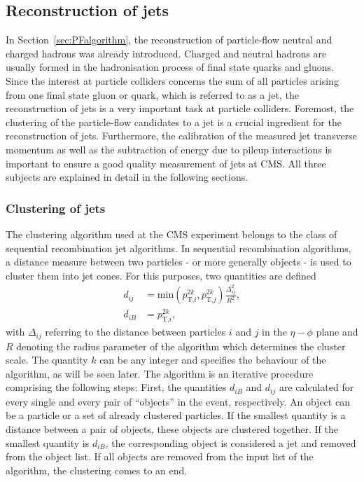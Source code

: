 \subsection{Reconstruction of jets} 
\label{sec:JetReconstruction}
In Section~\ref{sec:PFalgorithm}, the reconstruction of particle-flow neutral and charged hadrons was already introduced.
Charged and neutral hadrons are usually formed in the hadronisation process of final state quarks and gluons.
Since the interest at particle colliders concerns the sum of all particles arising from one final state gluon or quark, which is referred to as a jet, the reconstruction of jets is a very important task at particle colliders.
Foremost, the clustering of the particle-flow candidates to a jet is a crucial ingredient for the reconstruction of jets.
Furthermore, the calibration of the measured jet transverse momentum as well as the subtraction of energy due to pileup interactions is important to ensure a good quality \pt measurement of jets at CMS.
All three subjects are explained in detail in the following sections.
\subsubsection*{Clustering of jets}
The clustering algorithm used at the CMS experiment belongs to the class of sequential recombination jet algorithms.
In sequential recombination algorithms, a distance measure between two particles - or more generally objects - is used to cluster them into jet cones.
For this purposes, two quantities are defined
\begin{equation}
\begin{aligned}
\label{eq:Antikt}
d_{ij} &= \text{min}\left( p_{\text{T,}i}^{2k},p_{\text{T,}j}^{2k} \right) \frac{\Delta_{ij}^2}{R^2},\\
d_{iB} &= p_{\text{T,}i}^{2k},
\end{aligned} 
\end{equation}
with $\Delta_{ij}$ referring to the distance between particles $i$ and $j$ in the $\eta - \phi$ plane and $R$ denoting the radius parameter of the algorithm which determines the cluster scale.
The quantity $k$ can be any integer and specifies the behaviour of the algorithm, as will be seen later.
The algorithm is an iterative procedure comprising the following steps: 
First, the quantities $d_{iB}$ and $d_{ij}$ are calculated for every single and every pair of ``objects'' in the event, respectively.
An object can be a particle or a set of already clustered particles.
If the smallest quantity is a distance between a pair of objects, these objects are clustered together.
If the smallest quantity is $d_{iB}$, the corresponding object is considered a jet and removed from the object list.
If all objects are removed from the input list of the algorithm, the clustering comes to an end.

